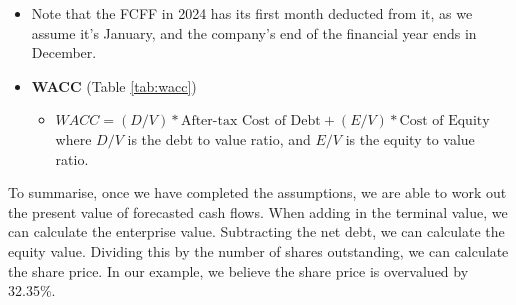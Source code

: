\begin{itemize}
\begin{itemize}
    \end{itemize}
    \item Note that the FCFF in 2024 has its first month deducted from it, as we assume it's January, and the company's end of the financial year ends in December.
    \item \textbf{WACC} (Table \ref{tab:wacc})
    \begin{itemize}
        \item $WACC = (D/V)*\text{After-tax Cost of Debt} + (E/V)*\text{Cost of Equity}$ where $D/V$ is the debt to value ratio, and $E/V$ is the equity to value ratio.
    \end{itemize}
\end{itemize}

To summarise, once we have completed the assumptions, we are able to work out the present value of forecasted cash flows. When adding in the terminal value, we can calculate the enterprise value. Subtracting the net debt, we can calculate the equity value. Dividing this by the number of shares outstanding, we can calculate the share price. In our example, we believe the share price is overvalued by 32.35\%.
